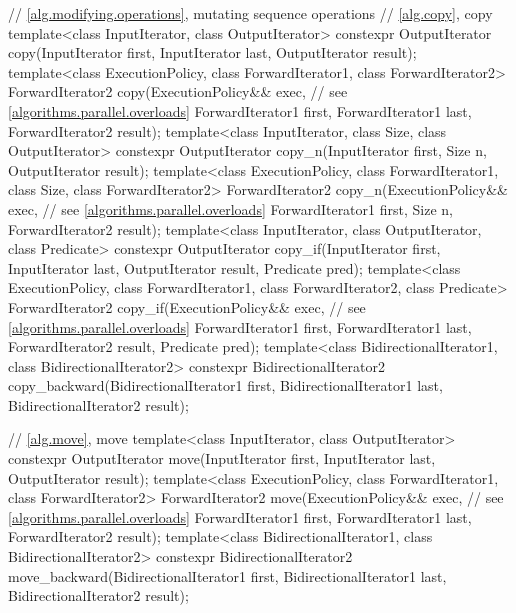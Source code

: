 \begin{codeblock}
{  // \ref{alg.modifying.operations}, mutating sequence operations
  // \ref{alg.copy}, copy
  template<class InputIterator, class OutputIterator>
    constexpr OutputIterator copy(InputIterator first, InputIterator last,
                                  OutputIterator result);
  template<class ExecutionPolicy, class ForwardIterator1, class ForwardIterator2>
    ForwardIterator2 copy(ExecutionPolicy&& exec, // see \ref{algorithms.parallel.overloads}
                          ForwardIterator1 first, ForwardIterator1 last,
                          ForwardIterator2 result);
  template<class InputIterator, class Size, class OutputIterator>
    constexpr OutputIterator copy_n(InputIterator first, Size n,
                                    OutputIterator result);
  template<class ExecutionPolicy, class ForwardIterator1, class Size,
           class ForwardIterator2>
    ForwardIterator2 copy_n(ExecutionPolicy&& exec, // see \ref{algorithms.parallel.overloads}
                            ForwardIterator1 first, Size n,
                            ForwardIterator2 result);
  template<class InputIterator, class OutputIterator, class Predicate>
    constexpr OutputIterator copy_if(InputIterator first, InputIterator last,
                                     OutputIterator result, Predicate pred);
  template<class ExecutionPolicy, class ForwardIterator1, class ForwardIterator2,
           class Predicate>
    ForwardIterator2 copy_if(ExecutionPolicy&& exec, // see \ref{algorithms.parallel.overloads}
                             ForwardIterator1 first, ForwardIterator1 last,
                             ForwardIterator2 result, Predicate pred);
  template<class BidirectionalIterator1, class BidirectionalIterator2>
    constexpr BidirectionalIterator2
      copy_backward(BidirectionalIterator1 first, BidirectionalIterator1 last,
                    BidirectionalIterator2 result);

  // \ref{alg.move}, move
  template<class InputIterator, class OutputIterator>
    constexpr OutputIterator move(InputIterator first, InputIterator last,
                                  OutputIterator result);
  template<class ExecutionPolicy, class ForwardIterator1,
           class ForwardIterator2>
    ForwardIterator2 move(ExecutionPolicy&& exec, // see \ref{algorithms.parallel.overloads}
                          ForwardIterator1 first, ForwardIterator1 last,
                          ForwardIterator2 result);
  template<class BidirectionalIterator1, class BidirectionalIterator2>
    constexpr BidirectionalIterator2
      move_backward(BidirectionalIterator1 first, BidirectionalIterator1 last,
                    BidirectionalIterator2 result);

}
\end{codeblock}
